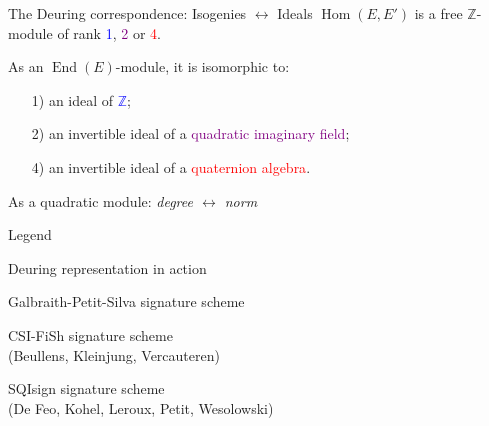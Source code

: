 \documentclass[aspectratio=169]{beamer}
\newcommand{\End}{\operatorname{End}}
\newcommand{\Hom}{\operatorname{Hom}}
\begin{document}

\begin{frame}{The Deuring correspondence: Isogenies $\longleftrightarrow$ Ideals}
  \large $\Hom(E,E')$ is a free $ℤ$-module of rank
  \textcolor{blue}{1}, \textcolor{purple}{2} or \textcolor{red}{4}.

  \bigskip
  As an $\End(E)$-module, it is isomorphic to:

  \bigskip
  \begin{enumerate}
    \setlength{\itemsep}{1em}
  \item[\color{blue}1)] an ideal of \textcolor{blue}{$ℤ$};
  \item[\color{purple}2)] an invertible ideal of a
    \textcolor{purple}{quadratic imaginary field};
  \item[\color{red}4)] an invertible ideal of a
    \textcolor{red}{quaternion algebra}.
  \end{enumerate}

  \bigskip
  As a quadratic module: \emph{degree $\longleftrightarrow$ norm}
\end{frame}


\begin{frame}{Legend}
  \large
\end{frame}


\begin{frame}{Deuring representation in action}
  \Large
  \begin{description}
    \setlength{\itemsep}{1em}
  \item[2016] Galbraith-Petit-Silva signature scheme
  \item[2019] CSI-FiSh signature scheme\\
    {\small (Beullens, Kleinjung, Vercauteren)}
  \item[2020] SQIsign signature scheme\\
    {\small (De Feo, Kohel, Leroux, Petit, Wesolowski)}
  \end{description}
\end{frame}
\end{document}
